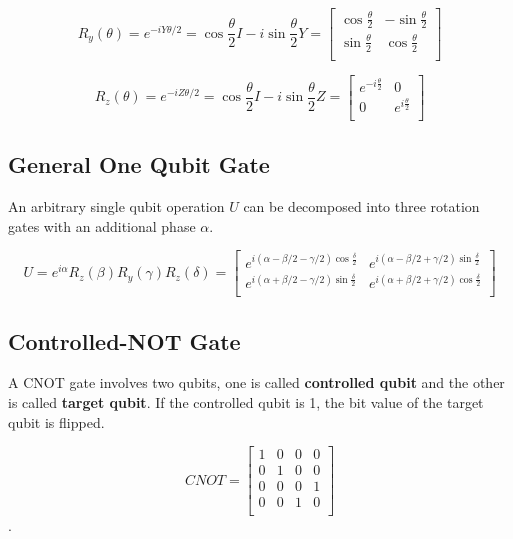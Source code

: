\begin{equation}
  R_y(\theta) = e^{-iY\theta/2} = \cos \frac{\theta}{2}I - i \sin\frac{\theta}{2}Y = \begin{bmatrix}
    \cos \frac{\theta}{2} & -\sin \frac{\theta}{2} \\
    \sin \frac{\theta}{2} & \cos \frac{\theta}{2} \\
    \end{bmatrix} 
\end{equation}

\begin{equation}
  R_z(\theta) = e^{-iZ\theta/2} = \cos \frac{\theta}{2}I - i \sin\frac{\theta}{2}Z = \begin{bmatrix}
    e^{-i \frac{\theta}{2}} & 0 \\
    0 & e^{i \frac{\theta}{2}} \\
    \end{bmatrix} 
\end{equation}

\subsection{General One Qubit Gate}

An arbitrary single qubit operation $U$ can be decomposed into three rotation gates with an additional phase $\alpha$.

\begin{equation}
 U = e^{i \alpha}R_z(\beta)R_y(\gamma)R_z(\delta) = \begin{bmatrix}
    e^{i (\alpha-\beta/2-\gamma/2)\cos\frac{\delta}{2}} & e^{i (\alpha-\beta/2+\gamma/2)\sin\frac{\delta}{2}}  \\
    e^{i (\alpha+\beta/2-\gamma/2)\sin\frac{\delta}{2}}  & e^{i (\alpha+\beta/2+\gamma/2)\cos\frac{\delta}{2}}  \\
    \end{bmatrix} 
\end{equation}

\subsection{Controlled-NOT Gate}
A CNOT gate involves two qubits, one is called \textbf{controlled qubit} and the other is called \textbf{target qubit}.  If the controlled qubit is 1, the bit value of the target qubit is flipped.

\begin{equation}
CNOT = \begin{bmatrix}
1 & 0 & 0 & 0 \\
0 & 1 & 0 & 0 \\
0 & 0 & 0 & 1 \\
0 & 0 & 1 & 0 \\
\end{bmatrix}
\end{equation}.

